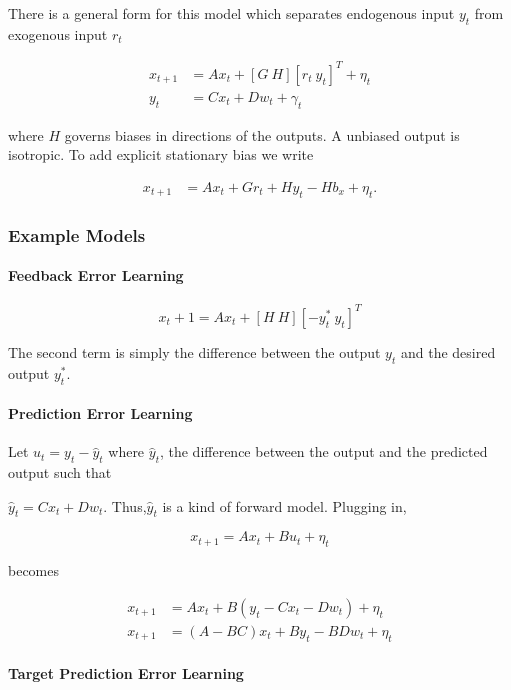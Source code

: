 \documentclass[../main.tex]{subfiles}
\begin{document}
There is a general form for this model which separates endogenous input
\(y_t\) from exogenous input \(r_t\)

\[
\begin{aligned}
x_{t+1} &= Ax_t + [G \ H][r_t \ y_t]^T + \eta_t \\
y_t &= Cx_t + Dw_t + \gamma_t
\end{aligned}
\]

where \(H\) governs biases in directions of the outputs. A unbiased
output is isotropic. To add explicit stationary bias we write

\[
\begin{aligned}
x_{t+1} &= Ax_t + Gr_t + Hy_t - Hb_x + \eta_t.
\end{aligned}
\]

\subsubsection{Example Models}\label{example-models}

\paragraph{Feedback Error Learning}\label{feedback-error-learning}

\[x_t+1 = Ax_t + [H\ H][-y_t^*\ y_t]^T\]

The second term is simply the difference between the output \(y_t\) and
the desired output \(y_t^*\).

\paragraph{Prediction Error Learning}\label{prediction-error-learning}

Let \(u_t = y_t - \hat{y}_t\) where \(\hat{y}_t\), the difference
between the output and the predicted output such that

\(\hat{y}_t = Cx_t + Dw_t\). Thus,\(\hat{y}_t\) is a kind of forward
model. Plugging in,

\[x_{t+1} = Ax_t + Bu_t + \eta_t\]

becomes

\[
\begin{aligned}
x_{t+1} &= Ax_t + B(y_t - Cx_t - Dw_t) + \eta_t \\
x_{t+1} &= (A-BC)x_t + By_t - BDw_t + \eta_t
\end{aligned}
\]

\paragraph{Target Prediction Error
Learning}\label{target-prediction-error-learning}
\end{document}
